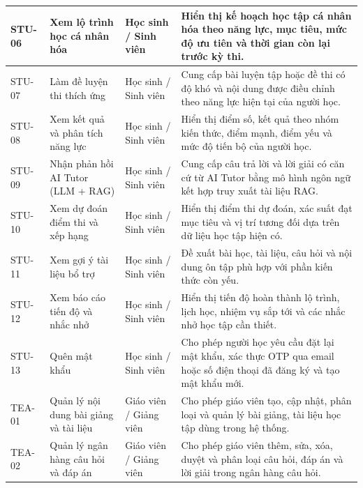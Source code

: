 \documentclass[12pt,a4paper,oneside]{report}
\begin{document}
\begin{longtable}{|p{}|p{}|p{}|p{}|}
STU-06 &
Xem lộ trình học cá nhân hóa &
Học sinh / Sinh viên &
Hiển thị kế hoạch học tập cá nhân hóa theo năng lực, mục tiêu, mức độ ưu tiên và thời gian còn lại trước kỳ thi. \\
\hline

STU-07 &
Làm đề luyện thi thích ứng &
Học sinh / Sinh viên &
Cung cấp bài luyện tập hoặc đề thi có độ khó và nội dung được điều chỉnh theo năng lực hiện tại của người học. \\
\hline

STU-08 &
Xem kết quả và phân tích năng lực &
Học sinh / Sinh viên &
Hiển thị điểm số, kết quả theo nhóm kiến thức, điểm mạnh, điểm yếu và mức độ tiến bộ của người học. \\
\hline

STU-09 &
Nhận phản hồi AI Tutor (LLM + RAG) &
Học sinh / Sinh viên &
Cung cấp câu trả lời và lời giải có căn cứ từ AI Tutor bằng mô hình ngôn ngữ kết hợp truy xuất tài liệu RAG. \\
\hline

STU-10 &
Xem dự đoán điểm thi và xếp hạng &
Học sinh / Sinh viên &
Hiển thị điểm thi dự đoán, xác suất đạt mục tiêu và vị trí tương đối dựa trên dữ liệu học tập hiện có. \\
\hline

STU-11 &
Xem gợi ý tài liệu bổ trợ &
Học sinh / Sinh viên &
Đề xuất bài học, tài liệu, câu hỏi và nội dung ôn tập phù hợp với phần kiến thức còn yếu. \\
\hline

STU-12 &
Xem báo cáo tiến độ và nhắc nhở &
Học sinh / Sinh viên &
Hiển thị tiến độ hoàn thành lộ trình, lịch học, nhiệm vụ sắp tới và các nhắc nhở học tập cần thiết. \\
\hline

STU-13 &
Quên mật khẩu &
Học sinh / Sinh viên &
Cho phép người học yêu cầu đặt lại mật khẩu, xác thực OTP qua email hoặc số điện thoại đã đăng ký và tạo mật khẩu mới. \\
\hline

TEA-01 &
Quản lý nội dung bài giảng và tài liệu &
Giáo viên / Giảng viên &
Cho phép giáo viên tạo, cập nhật, phân loại và quản lý bài giảng, tài liệu học tập dùng trong hệ thống. \\
\hline

TEA-02 &
Quản lý ngân hàng câu hỏi và đáp án &
Giáo viên / Giảng viên &
Cho phép giáo viên thêm, sửa, xóa, duyệt và phân loại câu hỏi, đáp án và lời giải trong ngân hàng câu hỏi. \\
\hline


\end{longtable}
\end{document}
